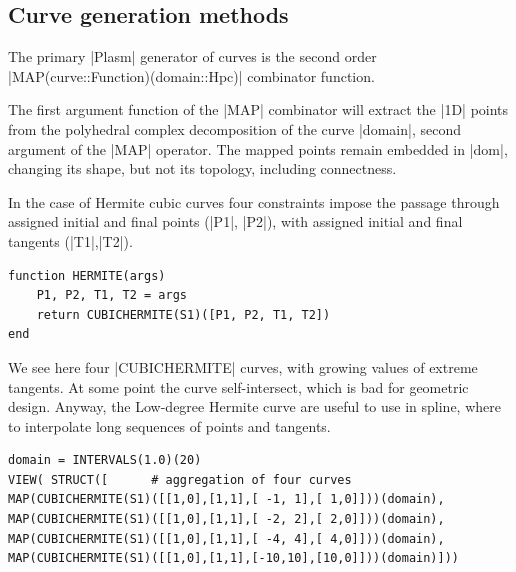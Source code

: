 \begin{coding}[Algebraic computation of FE = $\delta_1$]
{\subsection{ Curve generation methods}\label{sect:5-4-1}

The primary |Plasm| generator of curves is the second order |MAP(curve::Function)(domain::Hpc)| combinator function. 

\begin{remark}
The first argument function of the |MAP| combinator will extract the |1D| points from the polyhedral complex decomposition of the curve |domain|, second argument of the |MAP| operator. The mapped points remain embedded in |dom|, changing its shape, but not its topology, including connectness.
\end{remark}


\begin{condition}
In the case of Hermite cubic curves four constraints impose the passage through assigned initial and final points (|P1|, |P2|), with assigned initial and final tangents (|T1|,|T2|).
\begin{lstlisting}[language=JuliaLocal, style=julia, mathescape=true]
function HERMITE(args)
	P1, P2, T1, T2 = args
	return CUBICHERMITE(S1)([P1, P2, T1, T2])
end
\end{lstlisting}

We see here four |CUBICHERMITE| curves, with growing values of extreme tangents. At some point the curve self-intersect, which is bad for geometric design. Anyway, the Low-degree Hermite curve are useful to use in spline, where to interpolate long sequences of points and tangents.
\begin{lstlisting}[language=JuliaLocal, style=julia, mathescape=true]
domain = INTERVALS(1.0)(20)
VIEW( STRUCT([		# aggregation of four curves
MAP(CUBICHERMITE(S1)([[1,0],[1,1],[ -1, 1],[ 1,0]]))(domain),
MAP(CUBICHERMITE(S1)([[1,0],[1,1],[ -2, 2],[ 2,0]]))(domain),
MAP(CUBICHERMITE(S1)([[1,0],[1,1],[ -4, 4],[ 4,0]]))(domain),
MAP(CUBICHERMITE(S1)([[1,0],[1,1],[-10,10],[10,0]]))(domain)]))
\end{lstlisting}
\end{condition}

}
\end{coding}
